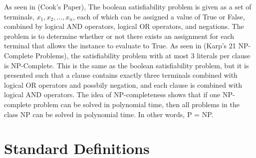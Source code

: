 \documentclass[manuscript]{acmart}
\begin{document}
        As seen in (Cook's Paper),
        The boolean satisfiability problem is given as a set of terminals, $x_1, x_2, ..., x_n$,
        each of which can be assigned a value of True or False,
        combined by logical AND operators, logical OR operators, and negations.
        The problem is to determine whether or not there exists an assignment
        for each terminal that allows the instance to evaluate to True.
        As seen in (Karp's 21 NP-Complete Problems), the satisfiability problem
        with at most 3 literals per clause is NP-Complete. This is the same 
        as the boolean satisfiability problem, but it is presented such that
        a clause contains exactly three terminals combined with logical OR operators
        and possbily negation, and each clause is combined with logical AND operators.
        The idea of NP-completeness shows that if one NP-complete problem can be solved
        in polynomial time, then all problems in the class NP can be solved in polynomial time.
        In other words, P = NP.
        
    \section{Standard Definitions}
\end{document}
